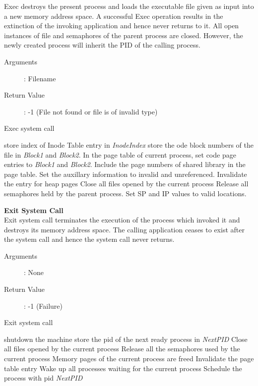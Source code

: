 \documentclass[10pt]{article}
\begin{document}
Exec destroys the present process and loads the executable file given as input into a new memory address space. A successful Exec operation results in the extinction of the invoking application and hence never returns to it. All open instances of file and semaphores of the parent process are closed. However, the newly created process will inherit the PID of the calling process.
\begin{description}
\item[Arguments]: Filename
\item[Return Value]: -1 (File not found or file is of invalid type)
\end{description} 
\begin{algorithm}
\caption{Exec system call}
\begin{algorithmic}
\ELSE
    \ELSE
        \STATE store index of Inode Table entry in \textit{InodeIndex}
        \STATE store the ode block numbers of the file in \textit{Block1} and \textit{Block2}.
    \ENDIF
\ENDIF
\STATE In the page table of current process, set code page entries to \textit{Block1} and \textit{Block2}.
\STATE Include the page numbers of shared library in the page table.
\STATE Set the auxillary information to invalid and unreferenced.
\STATE Invalidate the entry for heap pages
\STATE Close all files opened by the current process
\STATE Release all semaphores held by the parent process.
\STATE Set SP and IP values to valid locations.
\end{algorithmic}
\end{algorithm}
\textbf{Exit System Call}
\vspace{2mm}\\
 Exit system call terminates the execution of the process which invoked it and destroys its memory address space. The calling application ceases to exist after the system call and hence the system call never returns.
\begin{description}
\item[Arguments]: None
\item[Return Value]: -1 (Failure)
\end{description} 
\begin{algorithm}
\caption{Exit system call}
\begin{algorithmic}
    \STATE shutdown the machine
\ELSE 
    \STATE store the pid of the next ready process in \textit{NextPID}
\ENDIF
\STATE Close all files opened by the current process
\STATE Release all the semaphores used by the current process
\STATE Memory pages of the current process are freed
\STATE Invalidate the page table entry
\STATE Wake up all processes waiting for the current process
\STATE Schedule the process with pid \textit{NextPID}
\RETURN 
\end{algorithmic}
\end{algorithm}
\end{document}
